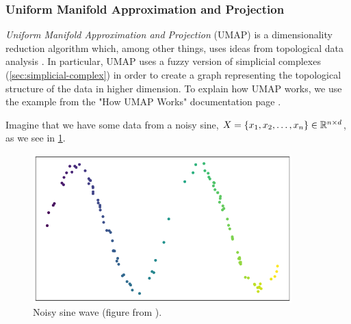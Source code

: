 \subsubsection{Uniform Manifold Approximation and Projection}
\label{sec:umap}
\textit{Uniform Manifold Approximation and Projection} (UMAP) is a dimensionality reduction algorithm which, among other things, uses ideas from topological data analysis \cite{2018arXivUMAP}. In particular, UMAP uses a fuzzy version of simplicial complexes (\cref{sec:simplicial-complex}) in order to create a graph representing the topological structure of the data in higher dimension. To explain how UMAP works, we use the example from the "How UMAP Works" documentation page \cite{how-umap-works-2018}.

Imagine that we have some data from a noisy sine, $X = \left\{x_1, x_2, \ldots, x_n\right\} \in \mathbb{R}^{n \times d}$, as we see in \cref{fig:how_umap_works_raw_data}.
\begin{figure}[H]
    \centering
    \includegraphics[width=10cm]{thesis/figures/how_umap_works_raw_data.png}
    \caption{Noisy sine wave (figure from \cite{how-umap-works-2018}).}
    \label{fig:how_umap_works_raw_data}
\end{figure}

